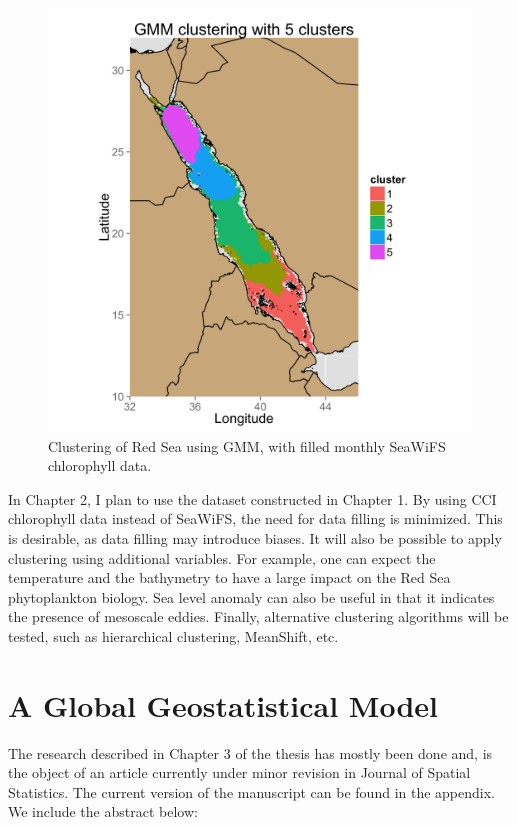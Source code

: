 \begin{figure}[h]
    \centering
    \includegraphics[scale=.15]{figures/clusters_k5.png}
    \caption{Clustering of Red Sea using GMM, with filled monthly SeaWiFS
             chlorophyll data.}
    \label{cluster}
\end{figure}

In Chapter 2, I plan to use the dataset constructed in Chapter 1.  By using CCI
chlorophyll data instead of SeaWiFS, the need for data filling is minimized.
This is desirable, as data filling may introduce biases. It will also be
possible to apply clustering using additional variables. For example, one can expect the
temperature and the bathymetry to have a large impact on the Red Sea
phytoplankton biology. Sea level anomaly can also be useful in that it indicates the
presence of mesoscale eddies. Finally, alternative clustering algorithms will
be tested, such as hierarchical clustering, MeanShift, etc.

\section{A Global Geostatistical Model}

The research described in Chapter 3 of the thesis has mostly been
done and, is the object of an article currently under minor revision in
Journal of Spatial Statistics. The current version
of the manuscript can be found in the appendix. We include the abstract below:

